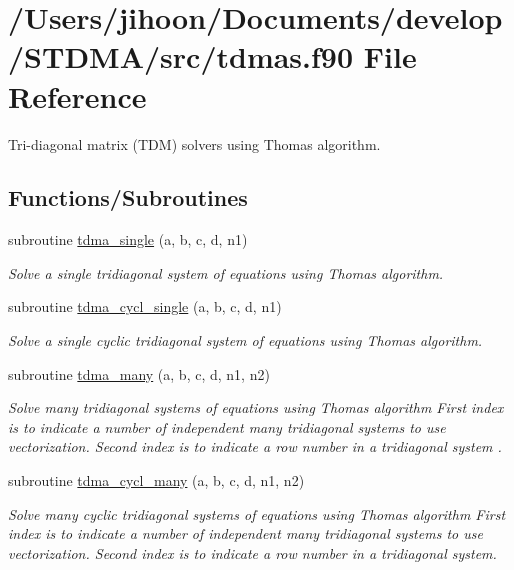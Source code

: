\hypertarget{tdmas_8f90}{}\section{/\+Users/jihoon/\+Documents/develop/\+S\+T\+D\+M\+A/src/tdmas.f90 File Reference}
\label{tdmas_8f90}


Tri-\/diagonal matrix (T\+DM) solvers using Thomas algorithm.  


\subsection*{Functions/\+Subroutines}
\begin{DoxyCompactItemize}
\item 
subroutine \mbox{\hyperlink{tdmas_8f90_a4a6130fff49607012fefacc8640424a7}{tdma\+\_\+single}} (a, b, c, d, n1)
\begin{DoxyCompactList}\small\item\em Solve a single tridiagonal system of equations using Thomas algorithm. \end{DoxyCompactList}\item 
subroutine \mbox{\hyperlink{tdmas_8f90_a4cb1f95e9c608085c5bb19baff639d9e}{tdma\+\_\+cycl\+\_\+single}} (a, b, c, d, n1)
\begin{DoxyCompactList}\small\item\em Solve a single cyclic tridiagonal system of equations using Thomas algorithm. \end{DoxyCompactList}\item 
subroutine \mbox{\hyperlink{tdmas_8f90_ab8cc761496e63e21ee8379d4fc077f05}{tdma\+\_\+many}} (a, b, c, d, n1, n2)
\begin{DoxyCompactList}\small\item\em Solve many tridiagonal systems of equations using Thomas algorithm First index is to indicate a number of independent many tridiagonal systems to use vectorization. Second index is to indicate a row number in a tridiagonal system . \end{DoxyCompactList}\item 
subroutine \mbox{\hyperlink{tdmas_8f90_a6c50d548eaa4b5e9b96ccbf8f65cb12a}{tdma\+\_\+cycl\+\_\+many}} (a, b, c, d, n1, n2)
\begin{DoxyCompactList}\small\item\em Solve many cyclic tridiagonal systems of equations using Thomas algorithm First index is to indicate a number of independent many tridiagonal systems to use vectorization. Second index is to indicate a row number in a tridiagonal system. \end{DoxyCompactList}\end{DoxyCompactItemize}


